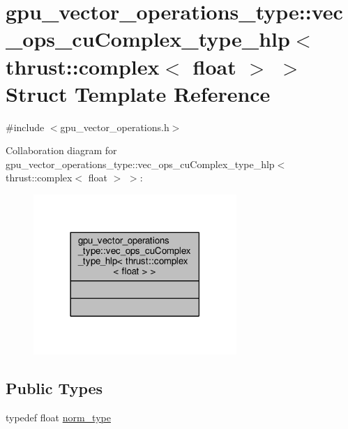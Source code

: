 \hypertarget{structgpu__vector__operations__type_1_1vec__ops__cuComplex__type__hlp_3_01thrust_1_1complex_3_01float_01_4_01_4}{\section{gpu\-\_\-vector\-\_\-operations\-\_\-type\-:\-:vec\-\_\-ops\-\_\-cu\-Complex\-\_\-type\-\_\-hlp$<$ thrust\-:\-:complex$<$ float $>$ $>$ Struct Template Reference}
\label{structgpu__vector__operations__type_1_1vec__ops__cuComplex__type__hlp_3_01thrust_1_1complex_3_01float_01_4_01_4}
}


{\ttfamily \#include $<$gpu\-\_\-vector\-\_\-operations.\-h$>$}



Collaboration diagram for gpu\-\_\-vector\-\_\-operations\-\_\-type\-:\-:vec\-\_\-ops\-\_\-cu\-Complex\-\_\-type\-\_\-hlp$<$ thrust\-:\-:complex$<$ float $>$ $>$\-:
\nopagebreak
\begin{figure}[H]
\begin{center}
\leavevmode
\includegraphics[width=218pt]{structgpu__vector__operations__type_1_1vec__ops__cuComplex__type__hlp_3_01thrust_1_1complex_3_01float_01_4_01_4__coll__graph}
\end{center}
\end{figure}
\subsection*{Public Types}
\begin{DoxyCompactItemize}
\item 
typedef float \hyperlink{structgpu__vector__operations__type_1_1vec__ops__cuComplex__type__hlp_3_01thrust_1_1complex_3_01float_01_4_01_4_ae6e9e0983048687ad977884788833222}{norm\-\_\-type}
\end{DoxyCompactItemize}


